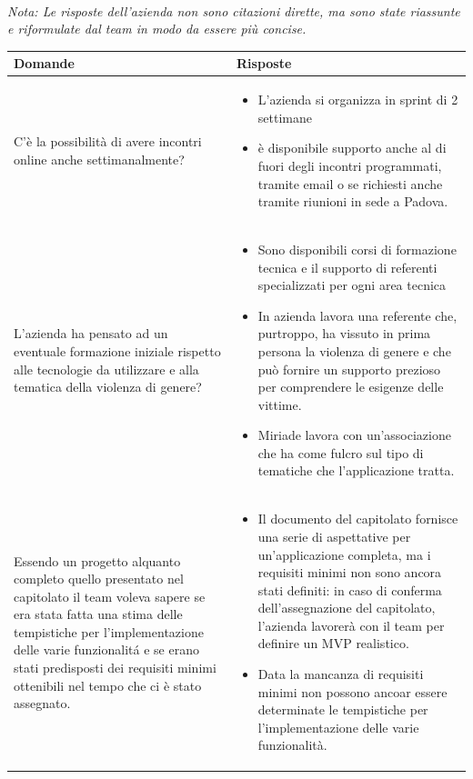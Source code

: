 \documentclass[a4paper,11pt]{article}
\begin{document}
\paragraph{}
\begin{center}
\small\textit{Nota: Le risposte dell’azienda non sono citazioni dirette, ma sono state riassunte e riformulate dal team in modo da essere più concise.}
\end{center}

{\footnotesize
\begin{tabularx}{\textwidth}{|>{\raggedright\arraybackslash}X|>{\raggedright\arraybackslash}X|}
\hline
\textbf{Domande} & \textbf{Risposte} \\
\hline
C'è la possibilità di avere incontri online anche settimanalmente?
&
\begin{itemize}
  \item L'azienda si organizza in sprint di 2 settimane
  \item è disponibile supporto anche al di fuori degli incontri programmati, tramite email o se richiesti anche tramite riunioni in sede a Padova.
\end{itemize}
\\
\hline
L'azienda ha pensato ad un eventuale formazione iniziale rispetto alle tecnologie da utilizzare e alla tematica della violenza di genere?
&
\begin{itemize}
  \item Sono disponibili corsi di formazione tecnica e il supporto di referenti specializzati per ogni area tecnica
  \item In azienda lavora una referente che, purtroppo, ha vissuto in prima persona la violenza di genere e che può fornire un supporto prezioso per comprendere le esigenze delle vittime.
  \item Miriade lavora con un'associazione che ha come fulcro sul tipo di tematiche che l'applicazione tratta. 
\end{itemize}\\
\hline
Essendo un progetto alquanto completo quello presentato nel capitolato il team voleva sapere se era stata fatta una stima delle tempistiche per l'implementazione delle varie funzionalitá e se erano stati predisposti dei requisiti minimi ottenibili nel tempo che ci è stato assegnato.
&
\begin{itemize}
  \item Il documento del capitolato fornisce una serie di aspettative per un'applicazione completa, ma i requisiti minimi non sono ancora stati definiti: in caso di conferma dell'assegnazione del capitolato, l'azienda lavorerà con il team per definire un MVP realistico.
  \item Data la mancanza di requisiti minimi non possono ancoar essere determinate le tempistiche per l'implementazione delle varie funzionalità.
\end{itemize}\\
\hline
\end{tabularx}
}  
\end{document}
